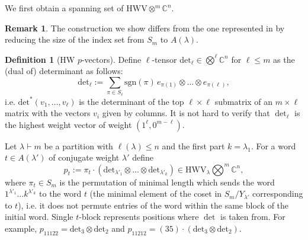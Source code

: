 \documentclass[12pt, reqno]{amsart}
\theoremstyle{definition}
\newtheorem{definition}[theorem]{Definition}
\newtheorem{remark}{Remark}[section]
\newcommand{\sgn}{\mathrm{sgn}}
\newcommand{\dett}{\mathrm{det}}
\begin{document}
We first obtain a spanning set of $\mathrm{HWV} \otimes^m \mathbb{C}^n$. 

\begin{remark}
The construction we show differs from the one represented in \cite{widg1} by reducing the size of the index set from $S_m$ to $A(\lambda)$.
\end{remark}

\begin{definition}[HW $p$-vectors]

    Define $\ell$-tensor $\dett_{\ell} \in \bigotimes^{\ell} \mathbb{C}^n$ for $\ell \le m$ as the (dual of) determinant as follows:
    $$
        \dett_{\ell} := \sum_{\pi \in S_\ell} \sgn(\pi)\, e_{\pi(1)} \otimes \ldots \otimes e_{\pi(\ell)},
    $$
    i.e. $\dett^{*}(v_1,\ldots,v_\ell)$ is the determinant of the top $\ell \times \ell$ submatrix of an $m \times \ell$ matrix with the vectors $v_i$ given by columns. It is not hard to verify that $\det_{\ell}$ is the highest weight vector of weight $(1^{\ell},0^{m - \ell})$. %

    Let $\lambda \vdash m$ be a partition with $\ell(\lambda) \le n$ and the first part $k = \lambda_1$. For a word $t \in A(\lambda')$ of conjugate weight $\lambda'$ define
    $$
        p_t := \pi_t \cdot (\dett_{\lambda'_1} \otimes\ldots\otimes \dett_{\lambda'_k}) \in \mathrm{HWV}_\lambda \bigotimes^m \mathbb{C}^n,
    $$
    where $\pi_t \in S_m$ is the permutation of minimal length which sends the word $1^{\lambda'_1}\ldots k^{\lambda'_k}$ to the word $t$ (the minimal element of the coset in $S_m / Y_{\lambda'}$ corresponding to $t$), i.e. it does not permute entries of the word within the same block of the initial word. Single $t$-block represents positions where $\det$ is taken from. For example, $p_{11122} = \dett_3 \otimes \dett_2$ and $p_{11212} = (35)\cdot (\dett_3 \otimes \dett_2)$. 

    

\end{definition}
\end{document}
